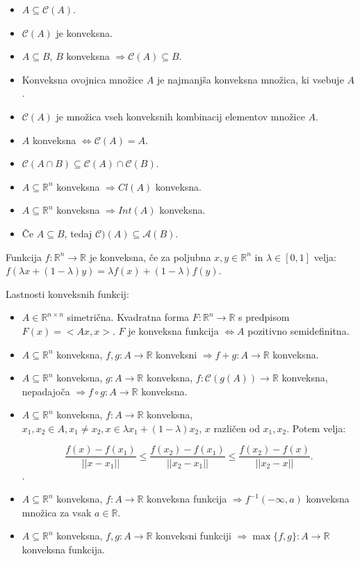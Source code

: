 \documentclass[10pt,a4paper]{amsart}
\theoremstyle{definition} %
\theoremstyle{plain} %
\newcommand{\R}{\mathbb R}
\begin{document}
\begin{itemize}
\item $A \subseteq \mathcal{C}(A)$.
\item $\mathcal{C}(A)$ je konveksna.
\item $A \subseteq B$, $B$ konveksna $\Longrightarrow \mathcal{C}(A) \subseteq B$.
\item Konveksna ovojnica množice $A$ je najmanjša konveksna množica, ki vsebuje $A$.
\item $\mathcal{C}(A)$ je množica vseh konveksnih kombinacij elementov množice $A$.
\item $A$ konveksna $\Longleftrightarrow \mathcal{C}(A) = A$.
\item $\mathcal{C}(A\cap B) \subseteq \mathcal{C}(A) \cap \mathcal{C}(B)$.
\item $A \subseteq \R^n$ konveksna $ \Longrightarrow Cl(A)$ konveksna.
\item $A \subseteq \R^n$ konveksna $\Longrightarrow Int(A)$ konveksna.
\item Če $A \subseteq B$, tedaj $ \mathcal{C})(A) \subseteq \mathcal{A}( B)$.
\end{itemize}

Funkcija $f:\R^n \rightarrow \R$ je konveksna, če za poljubna $x,y \in \R^n$ in $\lambda \in [0,1]$ velja: $f(\lambda x + (1- \lambda )y) = \lambda f(x) + (1-\lambda )f(y)$.

Lastnosti konveksnih funkcij:

\begin{itemize}
\item $A\in \R^{n\times n}$ simetrična. Kvadratna forma $F:\R^n \rightarrow \R$ s predpisom $F(x) = <Ax,x>$. $F$ je konveksna funkcija $\Longleftrightarrow A$ pozitivno semidefinitna.
\item $A \subseteq \R^n$  konveksna, $f,g:A \rightarrow \R$ konveksni $\Longrightarrow f+g:A \rightarrow \R$ konveksna.
\item $A \subseteq \R^n$  konveksna, $g:A \rightarrow \R$ konveksna, $f:\mathcal{C}(g(A)) \rightarrow \R$ konveksna, nepadajoča $\Longrightarrow f\circ g:A \rightarrow \R$ konveksna.
\item $A \subseteq \R^n$  konveksna, $f:A \rightarrow \R$ konveksna, $x_1,x_2 \in A, x_1 \neq x_2, x\in \lambda x_1 + (1-\lambda )x_2$, $x$ različen od $x_1, x_2$. Potem velja:

$$
\frac{f(x)-f(x_1)}{||x-x_1||} \leq \frac{f(x_2)-f(x_1)}{||x_2-x_1||} \leq \frac{f(x_2)-f(x)}{||x_2-x||}.
$$.

\item $A \subseteq \R^n$  konveksna, $f:A \rightarrow \R$ konveksna funkcija $\Longrightarrow f^{-1}(-\infty ,a)$ konveksna množica za vsak $a \in \R$.

\item  $A \subseteq \R^n$  konveksna, $f,g:A \rightarrow \R$ konveksni funkciji $\Longrightarrow \max \{ f,g \} : A \rightarrow \R$ konveksna funkcija.
\end{itemize}
\end{document}
